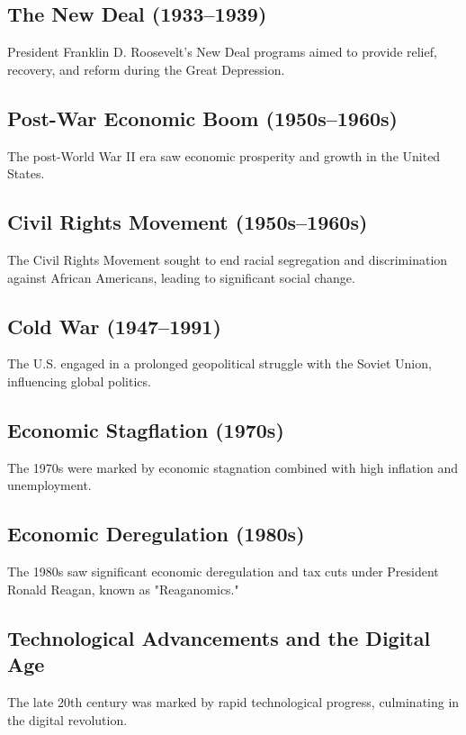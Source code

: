 \documentclass[a4paper,12pt]{book}
\begin{document}
\subsection{The New Deal (1933–1939)}
\label{subsec:new-deal}
President Franklin D. Roosevelt's New Deal programs aimed to provide relief, recovery, and reform during the Great Depression.

\subsection{Post-War Economic Boom (1950s–1960s)}
\label{subsec:post-war-economic-boom}
The post-World War II era saw economic prosperity and growth in the United States.

\subsection{Civil Rights Movement (1950s–1960s)}
\label{subsec:civil-rights-movement}
The Civil Rights Movement sought to end racial segregation and discrimination against African Americans, leading to significant social change.

\subsection{Cold War (1947–1991)}
\label{subsec:cold-war}
The U.S. engaged in a prolonged geopolitical struggle with the Soviet Union, influencing global politics.

\subsection{Economic Stagflation (1970s)}
\label{subsec:economic-stagflation}
The 1970s were marked by economic stagnation combined with high inflation and unemployment.

\subsection{Economic Deregulation (1980s)}
\label{subsec:economic-deregulation}
The 1980s saw significant economic deregulation and tax cuts under President Ronald Reagan, known as "Reaganomics."

\subsection{Technological Advancements and the Digital Age}
\label{subsec:technological-advancements-digital-age}
The late 20th century was marked by rapid technological progress, culminating in the digital revolution.
\end{document}
